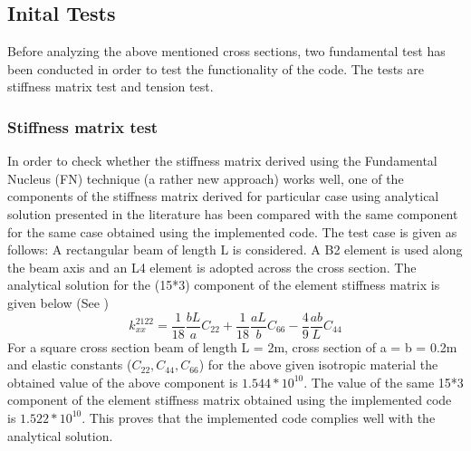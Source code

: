 \documentclass[a4paper,12pt]{article}
\begin{document}
\subsection*{Inital Tests}
\indent\indent\indent\indent Before analyzing the above mentioned cross sections, two fundamental test has been conducted in order to test the functionality of the code. The tests are stiffness matrix test and tension test.

\subsubsection*{Stiffness matrix test}
\indent\indent\indent\indent In order to check whether the stiffness matrix derived using the Fundamental Nucleus (FN) technique (a rather new approach) works well, one of the components of the stiffness matrix derived for particular case using analytical solution presented in the literature has been compared with the same component for the same case obtained using the implemented code. The test case is given as follows: A rectangular beam of length L is considered. A B2 element is used along the beam axis and an L4 element is adopted across the cross section. The analytical solution for the (15*3) component of the element stiffness matrix is given below (See \cite{carrera2014finite})
\begin{equation}
k^{2122}_{xx} = \frac{1}{18} \frac{b L}{a} C_{22} + \frac{1}{18} \frac{a L}{b} C_{66} - \frac{4}{9} \frac{a b}{L} C_{44}
\end{equation}
For a square cross section beam of length L = 2m, cross section of a = b = 0.2m and elastic constants ($C_{22},C_{44},C_{66}$) for the above given isotropic material the obtained value of the above component is $1.544*10^{10}$. The value of the same 15*3 component of the element stiffness matrix obtained using the implemented code is $1.522*10^{10}$. This proves that the implemented code complies well with the analytical solution.
\end{document}
